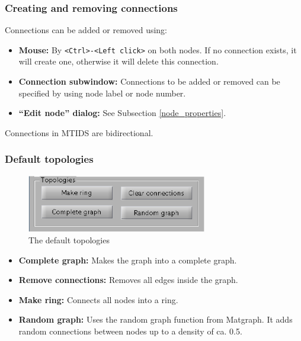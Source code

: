 \documentclass[a4paper,twoside, openright,12pt]{report}
\begin{document}
\subsubsection{Creating and removing connections}

Connections can be added or removed using:
\begin{itemize}
\item \textbf{Mouse:} By \verb|<Ctrl>-<Left click>| on both nodes. If no connection exists, it will create one, otherwise it will delete this connection. 
\item \textbf{Connection subwindow:} Connections to be added or removed can be specified by using node label or node number. 
\item \textbf{``Edit node'' dialog:} See Subsection \ref{node_properties}.
\end{itemize}


Connections in MTIDS are bidirectional.

\subsubsection{Default topologies}

\begin{figure}[h!]
 \centering
 \includegraphics[width= 0.7\textwidth]{./pics/mtids-ui-topologies.eps}
 \caption{The default topologies}
 \label{fig:mtids-ui-topologies}
\end{figure}

\begin{itemize}
\item \textbf{Complete graph:} Makes the graph into a complete graph.
\item \textbf{Remove connections:} Removes all edges inside the graph.
\item \textbf{Make ring:} Connects all nodes into a ring.
\item \textbf{Random graph:} Uses the random graph function from Matgraph. It adds random connections between nodes up to a density of ca. 0.5.
\end{itemize}
\end{document}
